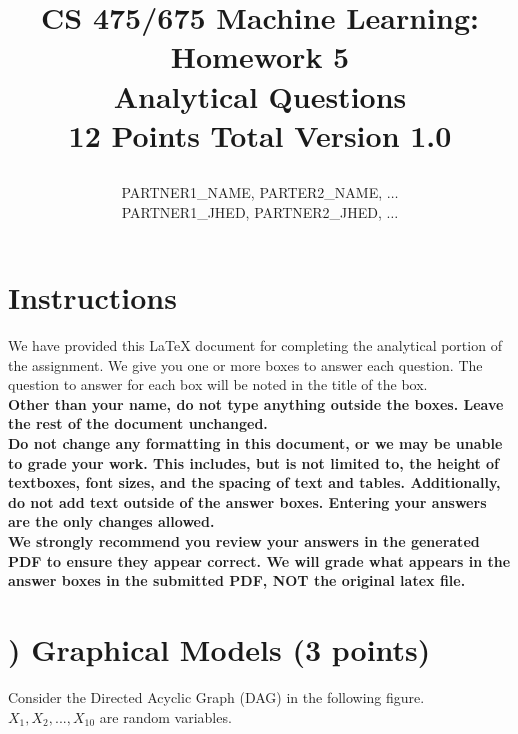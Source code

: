 \documentclass[11pt]{article}
\title{CS 475/675 Machine Learning: Homework 5\\
Analytical Questions\\
\Large{12 Points Total \hspace{1cm} Version 1.0}
\author{PARTNER1\_NAME, PARTER2\_NAME, $\ldots$ \\
PARTNER1\_JHED, PARTNER2\_JHED, $\ldots$}}
\date{}
\newcounter{QuestionCounter}
\newcounter{SubQuestionCounter}[QuestionCounter]
\newcommand{\newquestion}{\stepcounter{QuestionCounter}\setcounter{SubQuestionCounter}{1}\newpage}
\begin{document}
\maketitle
\thispagestyle{headings}


\section*{Instructions }
We have provided this \LaTeX{} document for completing the analytical portion of the assignment. We give you one or more boxes to answer each question.  The question to answer for each box will be noted in the title of the box.\\

{\bf Other than your name, do not type anything outside the boxes. Leave the rest of the document unchanged.}\\


\textbf{Do not change any formatting in this document, or we may be unable to
  grade your work. This includes, but is not limited to, the height of
  textboxes, font sizes, and the spacing of text and tables.  Additionally, do
  not add text outside of the answer boxes. Entering your answers are the only
  changes allowed.}\\


\textbf{We strongly recommend you review your answers in the generated PDF to
  ensure they appear correct. We will grade what appears in the answer boxes in
  the submitted PDF, NOT the original latex file.}

\pagebreak

\newquestion
\section*{) 
Graphical Models (3 points)} 

Consider the Directed Acyclic Graph (DAG) in the following figure. $X_1, X_2, ..., X_{10}$ are random variables.
\end{document}

